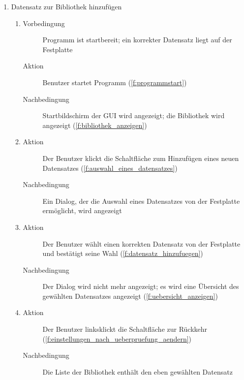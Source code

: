 \begin{enumerate} [label=\bfseries /TS \arabic*0/, leftmargin=*]
	\item Datensatz zur Bibliothek hinzufügen \label{ts:datensatz_hinzufuegen}
	\begin{enumerate}[leftmargin=0pt]
		\item
		\begin{description}
			\item[Vorbedingung] Programm ist startbereit; ein korrekter Datensatz liegt auf der Festplatte %
			\item[Aktion] Benutzer startet Programm (\ref{f:programmstart})
			\item[Nachbedingung] Startbildschirm der GUI wird angezeigt; die Bibliothek wird angezeigt (\ref{f:bibliothek_anzeigen})
		\end{description}
		\item
		\begin{description}
			\item[Aktion] Der Benutzer klickt die Schaltfläche zum Hinzufügen eines neuen Datensatzes (\ref{f:auswahl_eines_datensatzes})
			\item[Nachbedingung] Ein \gls{Dialog}, der die Auswahl eines Datensatzes von der Festplatte ermöglicht, wird angezeigt
		\end{description}
		\item
		\begin{description}
			\item[Aktion] Der Benutzer wählt einen korrekten Datensatz von der Festplatte und bestätigt seine Wahl (\ref{f:datensatz_hinzufuegen})
			\item[Nachbedingung] Der \gls{Dialog} wird nicht mehr angezeigt; es wird eine Übersicht des gewählten Datensatzes angezeigt (\ref{f:uebersicht_anzeigen})
		\end{description}
		\item
		\begin{description}
			\item[Aktion] Der Benutzer linksklickt die Schaltfläche zur Rückkehr (\ref{f:einstellungen_nach_ueberpruefung_aendern})
			\item[Nachbedingung] Die Liste der Bibliothek enthält den eben gewählten Datensatz
		\end{description}
	\end{enumerate}


\end{enumerate}
